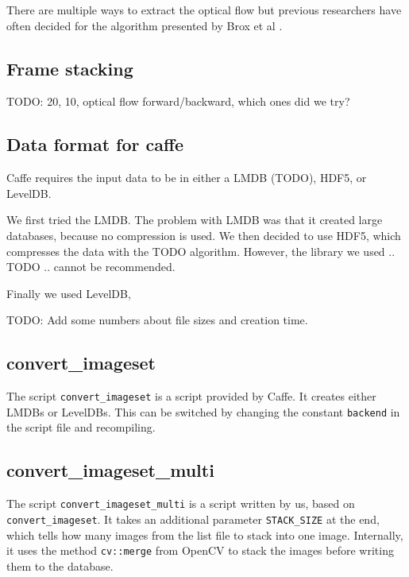 There are multiple ways to extract the optical flow but previous researchers have often decided for the algorithm presented by Brox et al
\cite{brox2004high}.



\subsection{Frame stacking}
TODO: 20, 10, optical flow forward/backward, which ones did we try?


\subsection{Data format for caffe}
Caffe requires the input data to be in either a LMDB (TODO), HDF5, or LevelDB.

We first tried the LMDB.
The problem with LMDB was that it created large databases, because no compression is used.
We then decided to use HDF5, which compresses the data with the TODO algorithm.
However, the library we used .. TODO .. cannot be recommended.

Finally we used LevelDB,

TODO: Add some numbers about file sizes and creation time.

\subsection{convert\_imageset}
The script \texttt{convert\_imageset} is a script provided by Caffe.
It creates either LMDBs or LevelDBs.
This can be switched by changing the constant \texttt{backend} in the script file and recompiling.

\subsection{convert\_imageset\_multi}
The script \texttt{convert\_imageset\_multi} is a script written by us, based on \texttt{convert\_imageset}.
It takes an additional parameter \texttt{STACK\_SIZE} at the end, which tells how many images from the list file to stack into one image.
Internally, it uses the method \texttt{cv::merge} from OpenCV to stack the images before writing them to the database.
